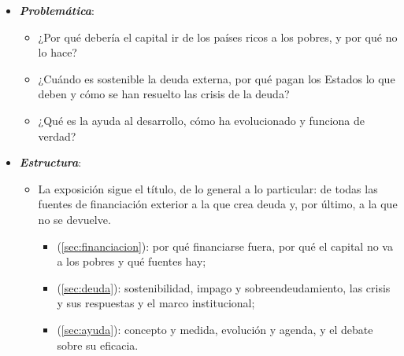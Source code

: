\documentclass[11pt]{article}
\begin{document}
\begin{itemize}
\item \textbf{\emph{Problemática}}:
  \begin{itemize}
  \item ¿Por qué debería el capital ir de los países ricos a los pobres, y por qué no lo hace?
  \item ¿Cuándo es sostenible la deuda externa, por qué pagan los Estados lo que deben y cómo se han resuelto las crisis de la deuda?
  \item ¿Qué es la ayuda al desarrollo, cómo ha evolucionado y funciona de verdad?
  \end{itemize}

\item \textbf{\emph{Estructura}}:
  \begin{itemize}
  \item La exposición sigue el título, de lo general a lo particular: de todas las fuentes de financiación exterior a la que crea deuda y, por último, a la que no se devuelve.
    \begin{itemize}
    \item {} (\ref{sec:financiacion}): por qué financiarse fuera, por qué el capital no va a los pobres y qué fuentes hay;
    \item {} (\ref{sec:deuda}): sostenibilidad, impago y sobreendeudamiento, las crisis y sus respuestas y el marco institucional;
    \item {} (\ref{sec:ayuda}): concepto y medida, evolución y agenda, y el debate sobre su eficacia.
    \end{itemize}
  \end{itemize}
\end{itemize}
\end{document}
